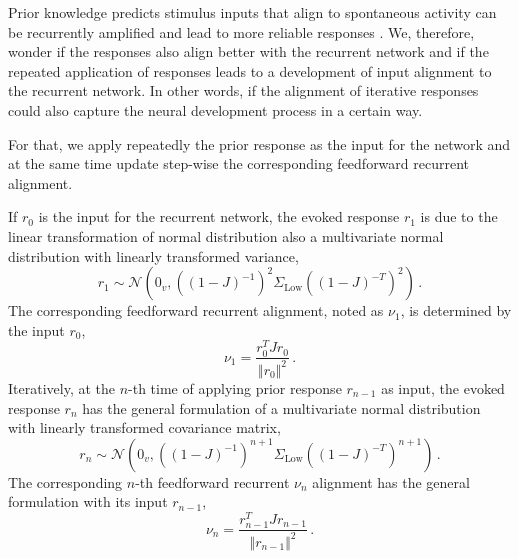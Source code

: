 \documentclass[11pt]{article}
\begin{document}
{	Prior knowledge predicts stimulus inputs that align to spontaneous activity can be recurrently amplified and lead to more reliable responses \cite{mulholland2023selective}. 
	We, therefore, wonder if the responses also align better with the recurrent network and if the repeated application of responses leads to a development of input alignment to the recurrent network. In other words, if the alignment of iterative responses could also capture the neural development process in a certain way.
	
	For that, we apply repeatedly the prior response as the input for the network and at the same time update step-wise the corresponding feedforward recurrent alignment. 
	
	If $r_0$ is the input for the recurrent network, the evoked response $r_1$ is due to the linear transformation of normal distribution also a multivariate normal distribution with linearly transformed variance, 
		\begin{equation}
			r_1 \sim \mathcal{N}\left(0_v, \left((1-J)^{-1}\right)^2 \Sigma_{\text{Low}} \left((1-J)^{-T}\right)^2\right) \, .
		\end{equation}
	The corresponding feedforward recurrent alignment, noted as $\nu_1$, is determined by the input $r_0$,
		\begin{equation}
			\nu_1 = \frac{r_0^T J r_0}{\Vert r_0 \Vert^2}\, .
		\end{equation}
	Iteratively, at the $n$-th time of applying prior response $r_{n-1}$ as input, the evoked response $r_n$ has the general formulation of a multivariate normal distribution with linearly transformed covariance matrix,
		\begin{equation}
			r_n \sim \mathcal{N}\left( 0_v, \left((1-J)^{-1}\right)^{n+1} \Sigma_{\text{Low}} \left((1-J)^{-T}\right)^{n+1} \right) \,. 
		\end{equation}
	The corresponding $n$-th feedforward recurrent $\nu_n$ alignment has the general formulation with its input $r_{n-1}$,
		\begin{equation} \label{eq:update_ffrec}
			\nu_n = \frac{r_{n-1}^T J r_{n-1}}{\Vert r_{n-1} \Vert^2} \,.
		\end{equation}
	
	
	\clearpage
}
\end{document}
